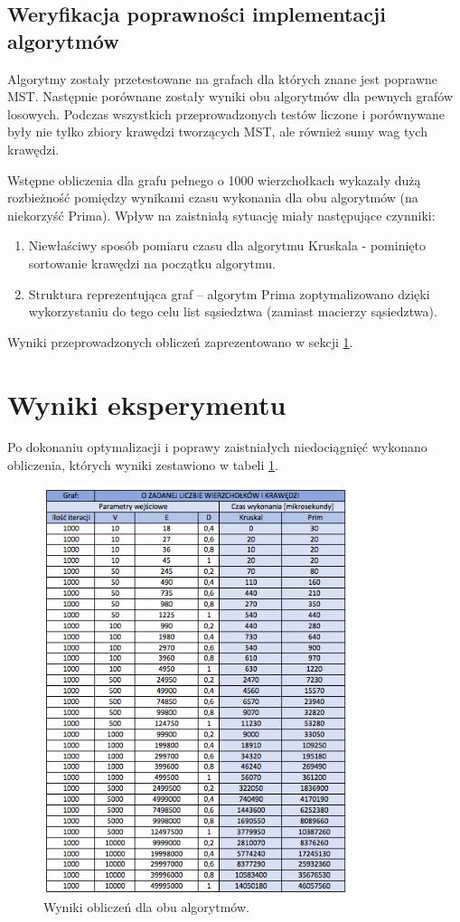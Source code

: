 \subsection{Weryfikacja poprawności implementacji algorytmów}
Algorytmy zostały przetestowane na grafach dla których znane jest poprawne MST. Następnie porównane zostały wyniki obu algorytmów dla pewnych grafów losowych. 
Podczas wszystkich przeprowadzonych testów liczone i porównywane były nie tylko zbiory krawędzi tworzących MST, ale również sumy wag tych krawędzi.

Wstępne obliczenia dla grafu pełnego o 1000 wierzchołkach wykazały dużą rozbieżność pomiędzy wynikami czasu wykonania dla obu algorytmów (na niekorzyść Prima). 
Wpływ na zaistniałą sytuację miały następujące czynniki:
\begin{enumerate}
	\item Niewłaściwy sposób pomiaru czasu dla algorytmu Kruskala - pominięto sortowanie  krawędzi na początku algorytmu.
	\item Struktura reprezentująca graf -- algorytm Prima zoptymalizowano dzięki wykorzystaniu do tego celu list sąsiedztwa (zamiast macierzy sąsiedztwa).
\end{enumerate}

Wyniki przeprowadzonych obliczeń zaprezentowano w sekcji \ref{results}.
\newpage
\section{Wyniki eksperymentu}
\label{results}
Po dokonaniu optymalizacji i poprawy zaistniałych niedociągnięć wykonano obliczenia, których wyniki zestawiono w tabeli \ref{fig: tab3}.
\begin{figure}[htb!]
	\centering
	\includegraphics[width=0.8\textwidth]{tex/fig/tab3}
	\caption{Wyniki obliczeń dla obu algorytmów.}
	\label{fig: tab3}
\end{figure}

